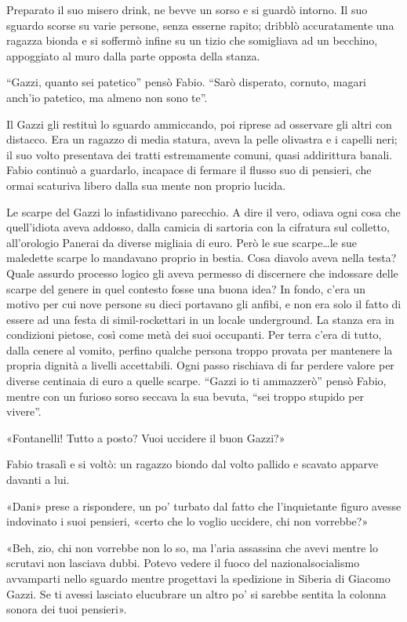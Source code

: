 Preparato il suo misero drink, ne bevve un sorso e si guardò intorno. Il suo sguardo scorse su varie persone, senza esserne rapito; dribblò accuratamente una ragazza bionda e si soffermò infine su un tizio che somigliava ad un becchino, appoggiato al muro dalla parte opposta della stanza.

``Gazzi, quanto sei patetico'' pensò Fabio. ``Sarò disperato, cornuto, magari anch'io patetico, ma almeno non sono te''.

Il Gazzi gli restituì lo sguardo ammiccando, poi riprese ad osservare gli altri con distacco. Era un ragazzo di media statura, aveva la pelle olivastra e i capelli neri; il suo volto presentava dei tratti estremamente comuni, quasi addirittura banali. Fabio continuò a guardarlo, incapace di fermare il flusso suo di pensieri, che ormai scaturiva libero dalla sua mente non proprio lucida.

Le scarpe del Gazzi lo infastidivano parecchio. A dire il vero, odiava ogni cosa che quell'idiota aveva addosso, dalla camicia di sartoria con la cifratura sul colletto, all'orologio Panerai da diverse migliaia di euro. Però le sue scarpe\ldots le sue maledette scarpe lo mandavano proprio in bestia. Cosa diavolo aveva nella testa? Quale assurdo processo logico gli aveva permesso di discernere che indossare delle scarpe del genere in quel contesto fosse una buona idea? In fondo, c'era un motivo per cui nove persone su dieci portavano gli anfibi, e non era solo il fatto di essere ad una festa di simil-rockettari in un locale underground. La stanza era in condizioni pietose, così come metà dei suoi occupanti. Per terra c'era di tutto, dalla cenere al vomito, perfino qualche persona troppo provata per mantenere la propria dignità a livelli accettabili. Ogni passo rischiava di far perdere valore per diverse centinaia di euro a quelle scarpe. ``Gazzi io ti ammazzerò'' pensò Fabio, mentre con un furioso sorso seccava la sua bevuta, ``sei troppo stupido per vivere''.

«Fontanelli! Tutto a posto? Vuoi uccidere il buon Gazzi?»

Fabio trasalì e si voltò: un ragazzo biondo dal volto pallido e scavato apparve davanti a lui.

«Dani» prese a rispondere, un po' turbato dal fatto che l'inquietante figuro avesse indovinato i suoi pensieri, «certo che lo voglio uccidere, chi non vorrebbe?»

«Beh, zio, chi non vorrebbe non lo so, ma l'aria assassina che avevi mentre lo scrutavi non lasciava dubbi. Potevo vedere il fuoco del nazionalsocialismo avvamparti nello sguardo mentre progettavi la spedizione in Siberia di Giacomo Gazzi. Se ti avessi lasciato elucubrare un altro po' si sarebbe sentita la colonna sonora dei tuoi pensieri».

